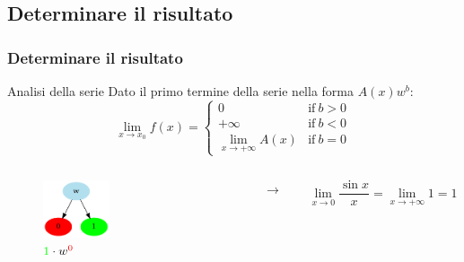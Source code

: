 \documentclass[aspectratio=149]{beamer}
\begin{document}
	\subsection{Determinare il risultato}
	
	\begin{frame}
		\frametitle{Determinare il risultato}
		\begin{block}{Analisi della serie}
			Dato il primo termine della serie nella forma \(A(x)w^b\):
			\[
			\lim_{x \to x_{0}}{f(x)} = \begin{cases}
				0 &\text{if} \: b > 0 \\
				+\infty &\text{if} \: b < 0\\
				\lim_{x \to +\infty}{A(x)} &\text{if} \: b = 0
			\end{cases}
			\]
		\end{block}
	\end{frame}

	\begin{frame}
		\begin{columns}
			\begin{column}{0.45\textwidth}
				\begin{figure}
					\includegraphics[width=0.4\textwidth]{pres_img/series.png}
					\caption{\(\textcolor{green}{1} \cdot w^{\textcolor{red}{0}}\)}
				\end{figure}
			\end{column}
			\begin{column}{0.1\textwidth}
				\begin{center}
					$\rightarrow$
				\end{center}
			\end{column}
			\begin{column}{0.45\textwidth}
				\begin{center}
					\[
						\lim_{x \to 0}{\frac{\sin{x}}{x}} = \lim_{x \to +\infty}{1} = 1
					\]
				\end{center}
			\end{column}
		\end{columns}
	\end{frame}
\end{document}
